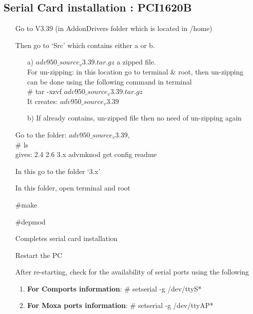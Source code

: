 \subsection{Serial Card installation : PCI1620B}
\begin{enumerate}
	\item [\textbullet] Go to V3.39 (in AddonDrivers folder which is located in /home)
	\item [\textbullet] Then go to `Src' which contains either a or b.
		\begin{enumerate}
			\item [a)] $adv950\_source_v3.39.tar.gz$ a zipped file. \\ For un-zipping: in this location go to terminal \& root, then un-zipping can be done using the following command in terminal\\
			$\#$ tar -xzvf $adv950\_source_v3.39.tar.gz$ \\
			It creates: $adv950\_source_v3.39$ 
			\item [b)] If already contains, un-zipped file then no need of un-zipping again
		\end{enumerate}
	\item [\textbullet] Go to the folder: $adv950\_source_v3.39$, \\
	$\#$ ls\\
	gives: 2.4  2.6  3.x advmknod get config readme
	\item [\textbullet] In this go to the folder `3.x'
	\item [\textbullet] In this folder, open terminal and root
	\item [\textbullet] $\#$make
	\item [\textbullet] $\#$depmod
	\item [\textbullet] Completes serial card installation
	\item [\textbullet] Restart the PC
	\item [\textbullet] After re-starting, check for the availability of serial ports using the following 
		\begin{enumerate}
			\item \textbf{For Comports information}: $\#$ setserial -g /dev/ttyS*
			\item \textbf{For Moxa ports information}:
			$\#$ setserial -g /dev/ttyAP*
		\end{enumerate}
\end{enumerate}

